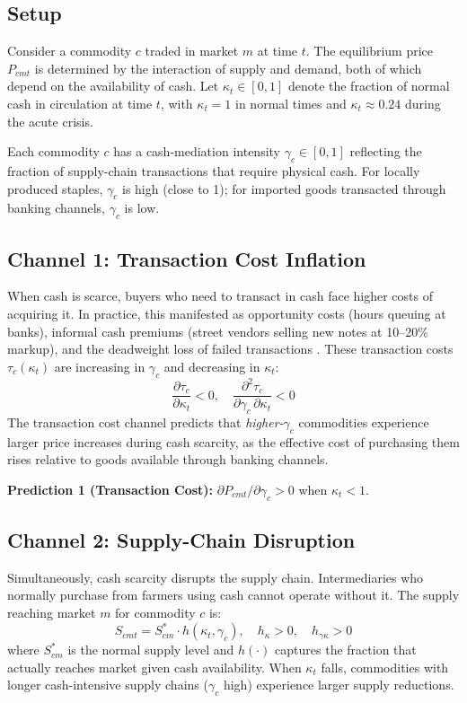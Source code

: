 \documentclass[12pt]{article}
\begin{document}
\subsection{Setup}

Consider a commodity $c$ traded in market $m$ at time $t$. The equilibrium price $P_{cmt}$ is determined by the interaction of supply and demand, both of which depend on the availability of cash. Let $\kappa_t \in [0,1]$ denote the fraction of normal cash in circulation at time $t$, with $\kappa_t = 1$ in normal times and $\kappa_t \approx 0.24$ during the acute crisis.

Each commodity $c$ has a cash-mediation intensity $\gamma_c \in [0,1]$ reflecting the fraction of supply-chain transactions that require physical cash. For locally produced staples, $\gamma_c$ is high (close to 1); for imported goods transacted through banking channels, $\gamma_c$ is low.

\subsection{Channel 1: Transaction Cost Inflation}

When cash is scarce, buyers who need to transact in cash face higher costs of acquiring it. In practice, this manifested as opportunity costs (hours queuing at banks), informal cash premiums (street vendors selling new notes at 10--20\% markup), and the deadweight loss of failed transactions \citep{punch2023}. These transaction costs $\tau_c(\kappa_t)$ are increasing in $\gamma_c$ and decreasing in $\kappa_t$:
\begin{equation}
\frac{\partial \tau_c}{\partial \kappa_t} < 0, \quad \frac{\partial^2 \tau_c}{\partial \gamma_c \, \partial \kappa_t} < 0
\label{eq:tau}
\end{equation}
The transaction cost channel predicts that \emph{higher-}$\gamma_c$ commodities experience larger price increases during cash scarcity, as the effective cost of purchasing them rises relative to goods available through banking channels.

\textbf{Prediction 1 (Transaction Cost):} $\partial P_{cmt} / \partial \gamma_c > 0$ when $\kappa_t < 1$.

\subsection{Channel 2: Supply-Chain Disruption}

Simultaneously, cash scarcity disrupts the supply chain. Intermediaries who normally purchase from farmers using cash cannot operate without it. The supply reaching market $m$ for commodity $c$ is:
\begin{equation}
S_{cmt} = S_{cm}^{*} \cdot h(\kappa_t, \gamma_c), \quad h_\kappa > 0, \quad h_{\gamma\kappa} > 0
\label{eq:supply}
\end{equation}
where $S_{cm}^{*}$ is the normal supply level and $h(\cdot)$ captures the fraction that actually reaches market given cash availability. When $\kappa_t$ falls, commodities with longer cash-intensive supply chains ($\gamma_c$ high) experience larger supply reductions.
\end{document}
